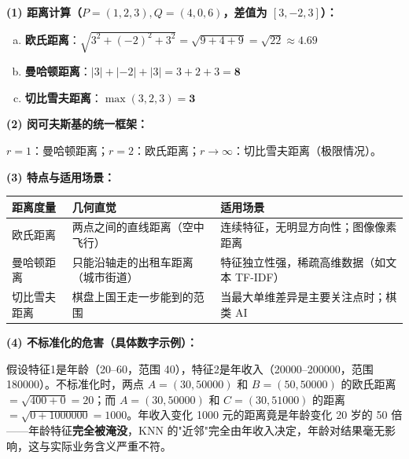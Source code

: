 \documentclass[a4paper,11pt]{ctexart}
\begin{document}
\begin{solutionbox}[参考答案与详细解析]
    \textbf{(1) 距离计算（$P=(1,2,3), Q=(4,0,6)$，差值为 $[3, -2, 3]$）：}
    \begin{enumerate}[a.]
        \item \textbf{欧氏距离}：$\sqrt{3^2+(-2)^2+3^2} = \sqrt{9+4+9} = \sqrt{22} \approx \mathbf{4.69}$
        \item \textbf{曼哈顿距离}：$|3|+|-2|+|3| = 3+2+3 = \mathbf{8}$
        \item \textbf{切比雪夫距离}：$\max(3, 2, 3) = \mathbf{3}$
    \end{enumerate}

    \textbf{(2) 闵可夫斯基的统一框架：}

    $r=1$：曼哈顿距离；$r=2$：欧氏距离；$r\to\infty$：切比雪夫距离（极限情况）。

    \textbf{(3) 特点与适用场景：}
    \begin{center}
    \begin{tabular}{p{2.5cm} p{4cm} p{5cm}}
        \toprule
        距离度量 & 几何直觉 & 适用场景 \\
        \midrule
        欧氏距离 & 两点之间的直线距离（空中飞行） & 连续特征，无明显方向性；图像像素距离 \\[0.8em]
        曼哈顿距离 & 只能沿轴走的出租车距离（城市街道） & 特征独立性强，稀疏高维数据（如文本 TF-IDF） \\[0.8em]
        切比雪夫距离 & 棋盘上国王走一步能到的范围 & 当最大单维差异是主要关注点时；棋类 AI \\
        \bottomrule
    \end{tabular}
    \end{center}

    \textbf{(4) 不标准化的危害（具体数字示例）：}

    假设特征1是年龄（20--60，范围 40），特征2是年收入（20000--200000，范围 180000）。不标准化时，两点 $A=(30, 50000)$ 和 $B=(50, 50000)$ 的欧氏距离 $= \sqrt{400 + 0} = 20$；而 $A=(30, 50000)$ 和 $C=(30, 51000)$ 的距离 $= \sqrt{0 + 1000000} = 1000$。年收入变化 1000 元的距离竟是年龄变化 20 岁的 50 倍——年龄特征\textbf{完全被淹没}，KNN 的"近邻"完全由年收入决定，年龄对结果毫无影响，这与实际业务含义严重不符。
\end{solutionbox}
\end{document}
